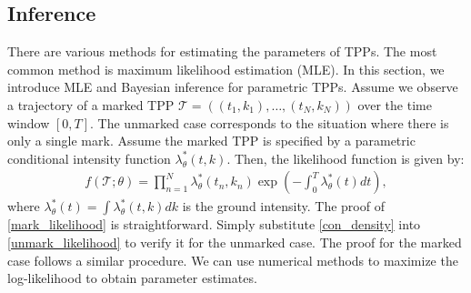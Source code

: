 \documentclass[10pt]{article} %
\begin{document}
\subsection{Inference}
\label{chapter_inference}

There are various methods for estimating the parameters of TPPs. The most common method is maximum likelihood estimation (MLE). 
In this section, we introduce MLE and Bayesian inference for parametric TPPs. 
Assume we observe a trajectory of a marked TPP \(\mathcal{T} = ((t_1, k_1), \ldots, (t_{N}, k_{N}))\) over the time window \([0, T]\). The unmarked case corresponds to the situation where there is only a single mark. 
Assume the marked TPP is specified by a parametric conditional intensity function \(\lambda_\theta^*(t, k)\). Then, the likelihood function is given by: 
\begin{equation}
\begin{aligned}
    f(\mathcal{T};\theta)=\prod_{n=1}^{N}\lambda_\theta^*(t_n,k_n)\exp\left(-\int_0^T \lambda_\theta^*(t)dt\right), 
\end{aligned}
\label{mark_likelihood}
\end{equation}
where $\lambda_\theta^*(t)=\int\lambda_\theta^*(t, k)dk$ is the ground intensity. 
The proof of \cref{mark_likelihood} is straightforward. Simply substitute \cref{con_density} into \cref{unmark_likelihood} to verify it for the unmarked case. The proof for the marked case follows a similar procedure. 
We can use numerical methods to maximize the log-likelihood to obtain parameter estimates. 
\end{document}
